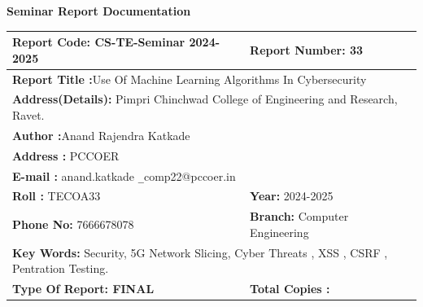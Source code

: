 \documentclass[oneside,a4paper,12pt]{report}
\begin{document}
\setlength{\arrayrulewidth}{0.5pt}
\newpage\begin{center}
\thispagestyle{empty}
    \LARGE \textbf{Seminar Report Documentation}
\end{center}
\begin{flushleft}
\hspace*{-1cm}
\begin{tabular}{|p{9cm}|p{7cm}|}  
    \hline
    \vspace{0.5mm} \textbf{Report Code:} CS-TE-Seminar 2024-2025 & \vspace{0.5mm}\textbf{Report Number:} 33 \\
    \hline
   \multicolumn{2}{|p{14cm}|}{ \vspace{0.5mm}\textbf{Report Title :}Use Of Machine Learning Algorithms In Cybersecurity} \\
    \hline
    \multicolumn{2}{|p{14cm}|}{\vspace{0.5mm} \textbf{Address(Details):} Pimpri Chinchwad College of Engineering and Research, Ravet.} \\
    \hline
    \multicolumn{2}{|p{14cm}|}{\vspace{0.5mm}\textbf{Author :}Anand Rajendra Katkade} \\
    \hline
    \multicolumn{2}{|p{14cm}|}{\vspace{0.5mm}\textbf{Address :} PCCOER} \\
    \hline
    \multicolumn{2}{|p{14cm}|}{\vspace{0.5mm}\textbf{E-mail :}\fontsize{13.2}{13.2} \selectfont anand.katkade \texttt{\_}comp22@pccoer.in}  \\
    \hline
    \vspace{0.5mm} \textbf{Roll :} TECOA33\vspace{0.5mm}  & \vspace{0.5mm}\textbf{Year:} 2024-2025 \\
    \hline
    \vspace{0.5mm} \textbf {Phone No:} 7666678078& \vspace{0.5mm}\textbf{Branch:} Computer Engineering \\
    \hline
    \multicolumn{2}{|p{14cm}|}{\vspace{0.5mm}\textbf{Key Words:} Security, 5G Network Slicing, Cyber Threats , XSS , CSRF , Pentration Testing.} \\
    \hline
    \vspace{0.5mm}\textbf{Type Of Report: FINAL} &  \vspace{0.5mm}\textbf{Total Copies :} \\

\end{tabular}
\end{flushleft}
\end{document}
